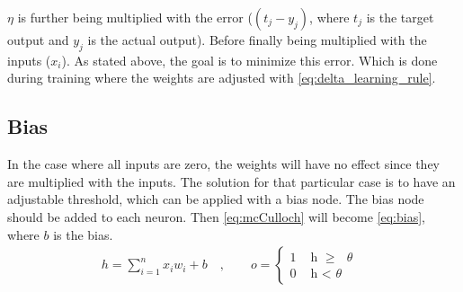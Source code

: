 \documentclass[USenglish]{ifimaster}  %
\begin{document}
$\eta$ is further being multiplied with the error ($(t_j - y_j)$, where $t_j$ is the target output and $y_j$ is the actual output). Before finally being multiplied with the inputs ($x_i$). As stated above, the goal is to minimize this error. Which is done during training where the weights are adjusted with \cref{eq:delta_learning_rule}.
\subsection{Bias}
In the case where all inputs are zero, the weights will have no effect since they are multiplied with the inputs. The solution for that particular case is to have an adjustable threshold, which can be applied with a bias node. The bias node should be added to each neuron. Then \cref{eq:mcCulloch} will become \cref{eq:bias}, where $b$ is the bias.
\begin{equation}\label{eq:bias}
\begin{aligned}
    {h = \sum_{i=1}^{n} x_i w_i + b \quad , \quad\quad o = 
\begin{cases}
    1 & \text{ h $\geq$ $\theta$ }  \\
    0 & \text{ h < $\theta$ }
\end{cases}}
\end{aligned}
\end{equation}
\end{document}
